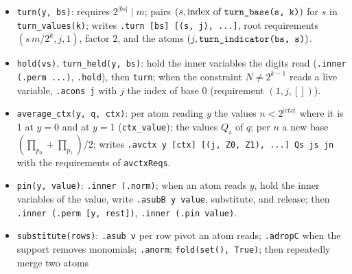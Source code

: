 \begin{itemize}
  $(m/4,j,1)$, factor $2$, atom $(j,b_0)$.
\item \textnormal{\texttt{turn(\allowbreak{}y,\allowbreak{} bs)}}: requires $2^{|bs|}\mid m$; pairs $(s, \text{index of } \textnormal{\texttt{turn\_\allowbreak{}base(\allowbreak{}s,\allowbreak{} k)}})$
  for $s$ in \textnormal{\texttt{turn\_\allowbreak{}values(\allowbreak{}k)}}; writes \textnormal{\texttt{.\allowbreak{}turn [bs] [(\allowbreak{}s,\allowbreak{} j),\allowbreak{} .\allowbreak{}.\allowbreak{}.\allowbreak{}]}}, root requirements
  $(s\,m/2^k, j, 1)$, factor $2$, and the atoms $(j,\textnormal{\texttt{turn\_\allowbreak{}indicator(\allowbreak{}bs,\allowbreak{} s)}})$.
\item \textnormal{\texttt{hold(\allowbreak{}vs)}}, \textnormal{\texttt{turn\_\allowbreak{}held(\allowbreak{}y,\allowbreak{} bs)}}: hold the inner variables the digits read
  (\textnormal{\texttt{.\allowbreak{}inner (\allowbreak{}.\allowbreak{}perm .\allowbreak{}.\allowbreak{}.\allowbreak{})}}, \textnormal{\texttt{.\allowbreak{}hold}}), then \textnormal{\texttt{turn}}; when the constraint $N\ne2^{k-1}$ reads a
  live variable, \textnormal{\texttt{.\allowbreak{}acons j}} with $j$ the index of base $0$ (requirement $(1,j,[])$).
\item \textnormal{\texttt{average\_\allowbreak{}ctx(\allowbreak{}y,\allowbreak{} q,\allowbreak{} ctx)}}: per atom reading $y$ the values $n<2^{|ctx|}$ where it is $1$ at
  $y=0$ and at $y=1$ (\textnormal{\texttt{ctx\_\allowbreak{}value}}); the values $Q_s$ of $q$; per $n$ a new base
  $(\prod_{p_0}+\prod_{p_1})/2$; writes \textnormal{\texttt{.\allowbreak{}avctx y [ctx] [(\allowbreak{}j,\allowbreak{} Z0,\allowbreak{} Z1),\allowbreak{} .\allowbreak{}.\allowbreak{}.\allowbreak{}] Qs js jn}} with the
  requirements of \textnormal{\texttt{avctxReqs}}.
\item \textnormal{\texttt{pin(\allowbreak{}y,\allowbreak{} value)}}: \textnormal{\texttt{.\allowbreak{}inner (\allowbreak{}.\allowbreak{}norm)}}; when an atom reads $y$, hold the inner variables of
  the value, write \textnormal{\texttt{.\allowbreak{}asubB y value}}, substitute, and release; then
  \textnormal{\texttt{.\allowbreak{}inner (\allowbreak{}.\allowbreak{}perm [y,\allowbreak{} rest])}}, \textnormal{\texttt{.\allowbreak{}inner (\allowbreak{}.\allowbreak{}pin value)}}.
\item \textnormal{\texttt{substitute(\allowbreak{}rows)}}: \textnormal{\texttt{.\allowbreak{}asub v}} per row pivot an atom reads; \textnormal{\texttt{.\allowbreak{}adropC}} when the
  support removes monomials; \textnormal{\texttt{.\allowbreak{}anorm}}; \textnormal{\texttt{fold(\allowbreak{}set(\allowbreak{}),\allowbreak{} True)}}; then repeatedly merge two atoms

\end{itemize}
